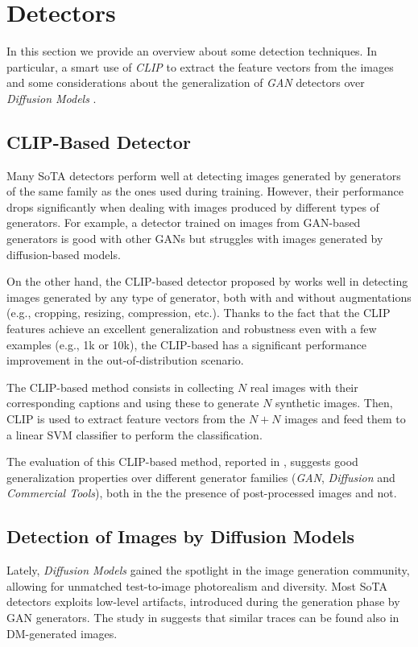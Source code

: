 \documentclass[conference]{IEEEtran} %
\begin{document}
\section{Detectors}
    In this section we provide an overview about some detection techniques. In particular, a smart use of \textit{CLIP} to extract the feature vectors from the images \cite{cozzolino2024raising} and some considerations about the generalization of \textit{GAN} detectors over \textit{Diffusion Models} \cite{corvi2023detection}.

    \subsection{CLIP-Based Detector}

        Many SoTA detectors perform well at detecting images generated by generators of the same family as the ones used during training. However, their performance drops significantly when dealing with images produced by different types of generators. For example, a detector trained on images from GAN-based generators is good with other GANs but struggles with images generated by diffusion-based models.
        
        On the other hand, the CLIP-based detector proposed by \cite{cozzolino2024raising} works well in detecting images generated by any type of generator, both with and without augmentations (e.g., cropping, resizing, compression, etc.). Thanks to the fact that the CLIP features achieve an excellent generalization and robustness even with a few examples (e.g., 1k or 10k), the CLIP-based has a significant performance improvement in the out-of-distribution scenario.

        The CLIP-based method consists in collecting $N$ real images with their corresponding captions and using these to generate $N$ synthetic images. Then, CLIP is used to extract feature vectors from the $N + N$ images and feed them to a linear SVM classifier to perform the classification.
        
        The evaluation of this CLIP-based method, reported in \cite{cozzolino2024raising}, suggests good generalization properties over different generator families (\textit{GAN}, \textit{Diffusion} and \textit{Commercial Tools}), both in the the presence of post-processed images and not.

    \subsection{Detection of Images by Diffusion Models}
        Lately, \textit{Diffusion Models} gained the spotlight in the image generation community, allowing for unmatched test-to-image photorealism and diversity. Most SoTA detectors exploits low-level artifacts, introduced during the generation phase by GAN generators. The study in \cite{corvi2023detection} suggests that similar traces can be found also in DM-generated images.
\end{document}
